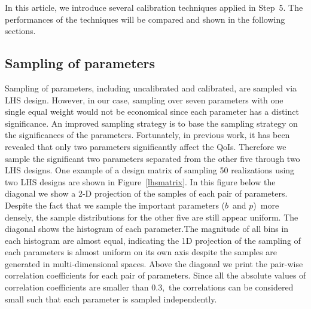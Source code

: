 \documentclass[review]{elsarticle}
\newcommand{\tcb}[1]{{#1}}
\begin{document}
In this article, we introduce several calibration techniques applied in Step~5. The performances of the techniques will be compared and shown in the following sections.

\subsection{Sampling of parameters}
Sampling of parameters, including uncalibrated and calibrated, are sampled via LHS design. However, in our case, sampling over seven parameters with one single equal weight would not be economical since each parameter has a distinct significance. An improved sampling strategy is to base the sampling strategy on the significances of the parameters. Fortunately, in previous work, it has been revealed that only two parameters significantly affect the QoIs. Therefore we sample the significant two parameters separated from the other five through two LHS designs. One example of a design matrix of sampling 50 realizations using  two LHS designs are shown in Figure~\ref{lhsmatrix}. In this figure below the diagonal we show a 2-D projection of the samples of each pair of parameters. \tcb{Despite the fact that we sample the important parameters ($b$\ and $p$)\ more densely, the sample distributions for the other five are still appear uniform.} The diagonal shows the histogram of each parameter.\tcb{The magnitude of all bins in each histogram are almost equal, indicating the 1D projection of the sampling of each parameters is almost uniform on its own axis despite the samples are generated in multi-dimensional spaces.} Above the diagonal we print the pair-wise correlation coefficients for each pair of parameters. \tcb{Since all the absolute values of correlation coefficients are smaller than $0.3$,\ the correlations can be considered small such that each parameter is sampled independently\cite{cohen}}. %
\end{document}
